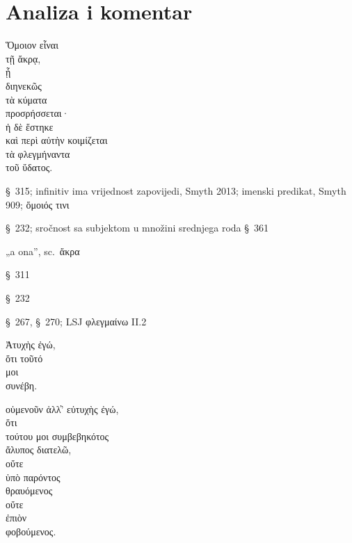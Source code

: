\section*{Analiza i komentar}


{\large
\begin{greek}
\noindent  Ὅμοιον εἶναι \\
\tabto{2em} τῇ ἄκρᾳ, \\

\tabto{4em} ᾗ \\
\tabto{6em} διηνεκῶς \\
\tabto{4em} τὰ κύματα \\
\tabto{4em} προσρήσσεται· \\
ἡ δὲ ἕστηκε \\
καὶ περὶ αὐτὴν κοιμίζεται \\
\tabto{2em} τὰ φλεγμήναντα \\
\tabto{4em} τοῦ ὕδατος. \\

\end{greek}
}

\begin{description}[noitemsep]
\item[ Ὅμοιον εἶναι] §~315; infinitiv ima vrijednost zapovijedi, Smyth 2013; imenski predikat, Smyth 909; \textgreek[variant=ancient]{ὅμοιός τινι}
\item[προσρήσσεται] §~232; sročnost sa subjektom u množini srednjega roda §~361
\item[ἡ δὲ] „a ona”, sc.\ ἄκρα
\item[ἕστηκε] §~311
\item[κοιμίζεται] §~232
\item[τὰ φλεγμήναντα] §~267, §~270; LSJ φλεγμαίνω II.2

\end{description}


{\large
\begin{greek}
\noindent Ἀτυχὴς ἐγώ, \\
\tabto{2em} ὅτι τοῦτό \\
\tabto{2em} μοι \\
\tabto{2em} συνέβη.

\noindent οὐμενοῦν ἀλλ̓' εὐτυχὴς ἐγώ, \\
\tabto{2em} ὅτι \\
\tabto{4em} τούτου μοι συμβεβηκότος \\
\tabto{2em} ἄλυπος διατελῶ, \\
οὔτε \\
\tabto{4em} ὑπὸ παρόντος \\
\tabto{2em} θραυόμενος \\
οὔτε \\
\tabto{2em} ἐπιὸν \\
\tabto{2em} φοβούμενος. \\

\end{greek}
}

